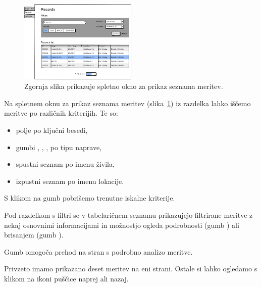 \documentclass[a4paper, 12pt]{book}
\begin{document}
\clearpage

\begin{figure}[h]
\begin{center}
\includegraphics[width=0.5\textwidth]{slike/Records.png}
\end{center}
\caption{Zgornja slika prikazuje spletno okno za prikaz seznama meritev.}
\label{records-wireframe}
\end{figure}

Na spletnem oknu za prikaz seznama meritev (slika~\ref{records-wireframe}) iz razdelka  lahko iščemo meritve po različnih kriterijih. Te so:
\begin{itemize}
	\item polje  po ključni besedi,
	\item gumbi , , ,  po tipu naprave,
	\item spustni seznam  po imenu živila,
	\item izpustni seznam  po imenu lokacije.  
\end{itemize}

S klikom na gumb  pobrišemo trenutne iskalne kriterije.


Pod razdelkom s filtri se v tabelaričnem seznamu prikazujejo filtrirane meritve z nekaj osnovnimi informacijami in možnostjo ogleda podrobnosti (gumb ) ali brisanjem (gumb ).

Gumb  omogoča prehod na stran s podrobno analizo meritve.

Privzeto imamo prikazano deset meritev na eni strani. Ostale si lahko ogledamo s klikom na ikoni puščice naprej ali nazaj.

\clearpage
\end{document}
